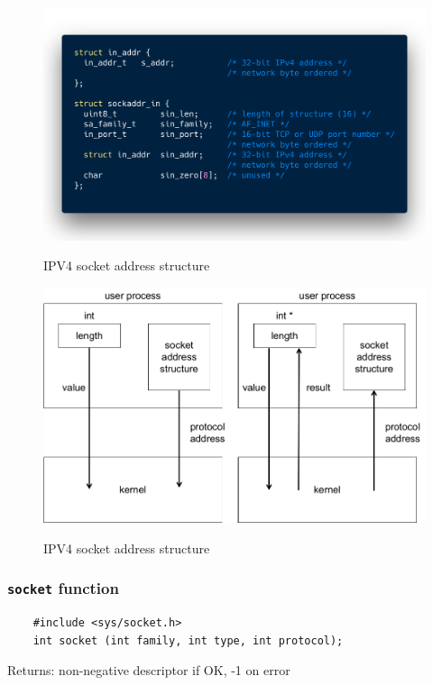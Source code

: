   \begin{figure}
  \centering
  \includegraphics[width=.8\textwidth]{code/02code01.png}\\
  \caption{IPV4 socket address structure}
  \label{1}
  \end{figure}

  \begin{figure}
  \centering
  \includegraphics[width=.8\textwidth]{fig/02fig01.png}\\
  \caption{IPV4 socket address structure}
  \label{1}
  \end{figure}

\begin{frame}[containsverbatim]
  \frametitle{\texttt{socket} function}
  {\scriptsize
  \begin{verbatim}
    #include <sys/socket.h>
    int socket (int family, int type, int protocol);
  \end{verbatim}
  \begin{flushright}
    Returns: non-negative descriptor if OK, -1 on error
  \end{flushright}
  }
\end{frame}
